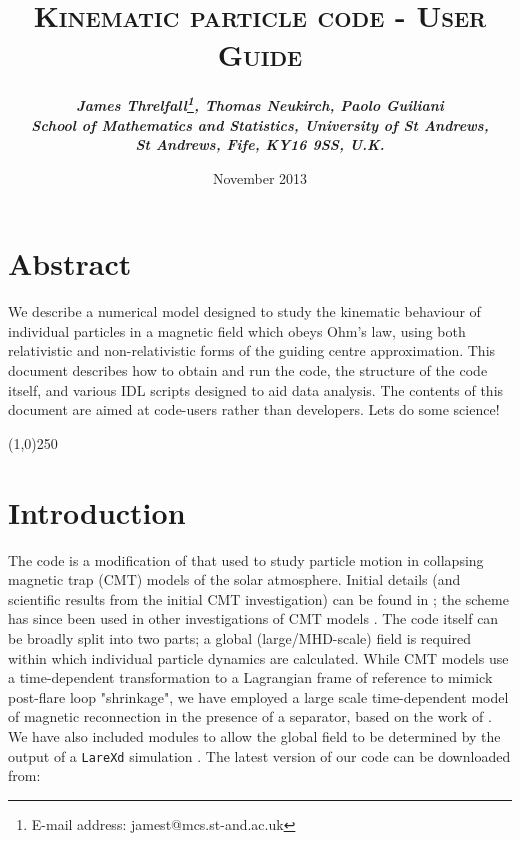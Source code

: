 \documentclass[a4paper,11pt,usenames,dvipsnames]{article}
\begin{document}
\title{
\bfseries\scshape Kinematic particle code - User Guide}
\author{\bfseries\itshape James Threlfall\thanks{E-mail address: jamest@mcs.st-and.ac.uk}, Thomas Neukirch, Paolo Guiliani \\
School of Mathematics and Statistics, University of St Andrews,\\
St Andrews, Fife, KY16 9SS, U.K.}
\date{November 2013}
\maketitle

\thispagestyle{empty}

 \section*{Abstract}
 We describe a numerical model designed to study the kinematic behaviour of individual particles in a magnetic field which obeys Ohm's law, using both relativistic and non-relativistic forms of the guiding centre approximation. This document describes how to obtain and run the code, the structure of the code itself, and various IDL scripts designed to aid data analysis. The contents of this document are aimed at code-users rather than developers. Lets do some science!

 \begin{center}
 \line(1,0){250}
 \end{center}

\section{Introduction}\label{sec:intro}
 The code is a modification of that used to study particle motion in collapsing magnetic trap (CMT) models of the solar atmosphere. Initial details (and scientific results from the initial CMT investigation) can be found in \citet{paper:Guilianietal2005}; the scheme has since been used in other investigations of CMT models \citep{paper:GradyNeukirch2009,paper:Gradyetal2012}. The code itself can be broadly split into two parts; a global (large/MHD-scale) field is required within which individual particle dynamics are calculated. While CMT models use a time-dependent transformation to a Lagrangian frame of reference to mimick post-flare loop "shrinkage", we have employed a large scale time-dependent model of magnetic reconnection in the presence of a separator, based on the work of \citet{paper:Wilmot-SmithHornig2011}. We have also included modules to allow the global field to be determined by the output of a {\tt{LareXd}} simulation \citep[see e.g.][]{paper:LareXd2001}. The latest version of our code can be downloaded from:
\end{document}
